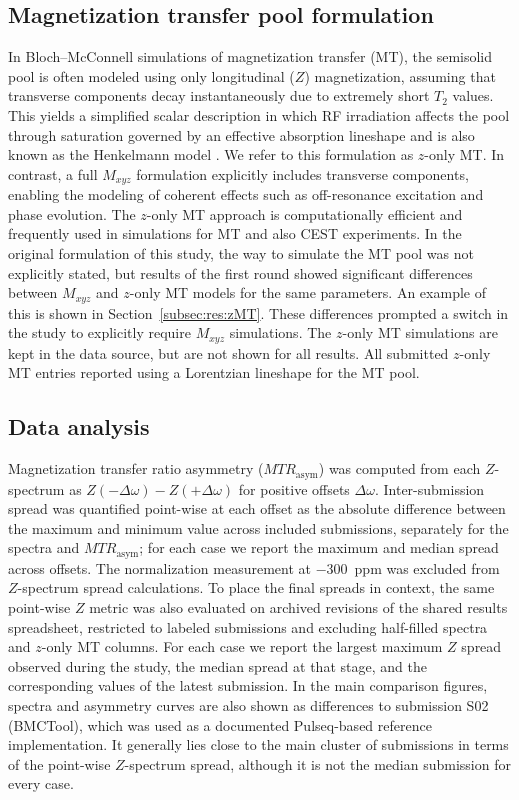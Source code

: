 \documentclass[11pt,a4paper]{article}
\begin{document}
\subsection{Magnetization transfer pool formulation}\label{subsec:methods:mt}
In Bloch–McConnell simulations of magnetization transfer (MT), the semisolid pool is often modeled using only longitudinal ($Z$) magnetization, assuming that transverse components decay instantaneously due to extremely short $T_2$ values. This yields a simplified scalar description in which RF irradiation affects the pool through saturation governed by an effective absorption lineshape and is also known as the Henkelmann model \cite{Graham1997}.
We refer to this formulation as $z$-only MT.
In contrast, a full $M_{xyz}$ formulation explicitly includes transverse components, enabling the modeling of coherent effects such as off-resonance excitation and phase evolution. The $z$-only MT approach is computationally efficient and frequently used in simulations for MT and also CEST experiments.
In the original formulation of this study, the way to simulate the MT pool was not explicitly stated, but results of the first round showed significant differences between $M_{xyz}$ and $z$-only MT models for the same parameters. An example of this is shown in Section~\ref{subsec:res:zMT}. 
These differences prompted a switch in the study to explicitly require $M_{xyz}$ simulations.
The $z$-only MT simulations are kept in the data source, but are not shown for all results. 
All submitted $z$-only MT entries reported using a Lorentzian lineshape for the MT pool.


\subsection{Data analysis}\label{subsec:analysis}
Magnetization transfer ratio asymmetry ($MTR_{\mathrm{asym}}$) was computed from each $Z$-spectrum as $Z(-\Delta\omega) - Z(+\Delta\omega)$ for positive offsets $\Delta\omega$. 
Inter-submission spread was quantified point-wise at each offset as the absolute difference between the maximum and minimum value across included submissions, separately for the spectra and $MTR_{\mathrm{asym}}$; for each case we report the maximum and median spread across offsets.
The normalization measurement at $-300$~ppm was excluded from $Z$-spectrum spread calculations. 
To place the final spreads in context, the same point-wise $Z$ metric was also evaluated on archived revisions of the shared results spreadsheet, restricted to labeled submissions and excluding half-filled spectra and $z$-only MT columns. For each case we report the largest maximum $Z$ spread observed during the study, the median spread at that stage, and the corresponding values of the latest submission.
In the main comparison figures, spectra and asymmetry curves are also shown as differences to submission S02 (BMCTool), which was used as a documented Pulseq-based reference implementation. It generally lies close to the main cluster of submissions in terms of the point-wise $Z$-spectrum spread, although it is not the median submission for every case.
\end{document}
